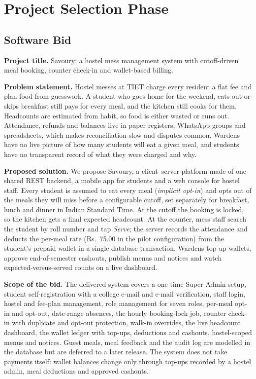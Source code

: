 \documentclass[11pt,a4paper]{article}
\begin{document}
\section{Project Selection Phase}
\subsection{Software Bid}

\textbf{Project title.} Savoury: a hostel mess management system with
cutoff-driven meal booking, counter check-in and wallet-based billing.

\textbf{Problem statement.} Hostel messes at TIET charge every resident a flat
fee and plan food from guesswork. A student who goes home for the weekend, eats
out or skips breakfast still pays for every meal, and the kitchen still cooks
for them. Headcounts are estimated from habit, so food is either wasted or runs
out. Attendance, refunds and balances live in paper registers, WhatsApp groups
and spreadsheets, which makes reconciliation slow and disputes common. Wardens
have no live picture of how many students will eat a given meal, and students
have no transparent record of what they were charged and why.

\textbf{Proposed solution.} We propose Savoury, a client--server
platform made of one shared REST backend, a mobile app for students and a web
console for hostel staff. Every student is assumed to eat every meal
(\emph{implicit opt-in}) and opts out of the meals they will miss before a
configurable cutoff, set separately for breakfast, lunch and dinner in Indian
Standard Time. At the cutoff the booking is locked, so the kitchen gets a final
expected headcount. At the counter, mess staff search the student by roll number
and tap \emph{Serve}; the server records the attendance and deducts the
per-meal rate (Rs.\ 75.00 in the pilot configuration) from the student's prepaid
wallet in a single database transaction. Wardens top up wallets, approve
end-of-semester cashouts, publish menus and notices and watch expected-versus-served
counts on a live dashboard.

\textbf{Scope of the bid.} The delivered system covers a one-time Super Admin
setup, student self-registration with a college e-mail and e-mail verification,
staff login, hostel and fee-plan management, role management for seven roles,
per-meal opt-in and opt-out, date-range absences, the hourly booking-lock job,
counter check-in with duplicate and opt-out protection, walk-in overrides,
the live headcount dashboard, the wallet ledger with top-ups, deductions and
cashouts, hostel-scoped menus and notices. Guest meals, meal feedback and the
audit log are modelled in the database but are deferred to a later release.
The system does not take payments itself: wallet balances change only through
top-ups recorded by a hostel admin, meal deductions and approved cashouts.
\end{document}
